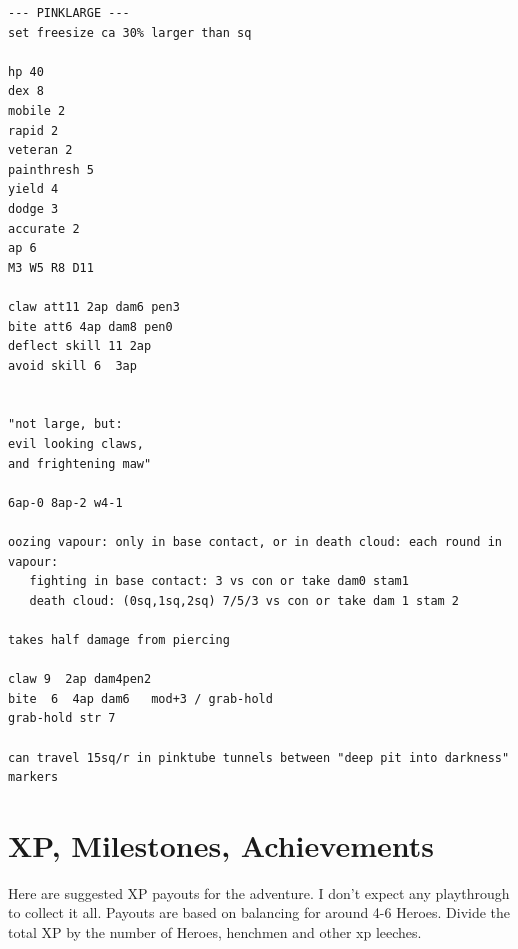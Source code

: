 \goodbreak
\begin{samepage}
\small \begin{verbatim}
--- PINKLARGE ---
set freesize ca 30% larger than sq

hp 40
dex 8
mobile 2
rapid 2
veteran 2
painthresh 5
yield 4
dodge 3
accurate 2
ap 6
M3 W5 R8 D11

claw att11 2ap dam6 pen3
bite att6 4ap dam8 pen0
deflect skill 11 2ap
avoid skill 6  3ap


"not large, but:
evil looking claws,
and frightening maw"

6ap-0 8ap-2 w4-1

oozing vapour: only in base contact, or in death cloud: each round in vapour:
   fighting in base contact: 3 vs con or take dam0 stam1
   death cloud: (0sq,1sq,2sq) 7/5/3 vs con or take dam 1 stam 2

takes half damage from piercing

claw 9  2ap dam4pen2
bite  6  4ap dam6   mod+3 / grab-hold
grab-hold str 7

can travel 15sq/r in pinktube tunnels between "deep pit into darkness" markers
\end{verbatim} \normalsize
\end{samepage}


























\clearpage
{}
\section*{XP, Milestones, Achievements}

Here are suggested XP payouts for the adventure. I don't expect any playthrough to collect it all.
Payouts are based on balancing for around 4-6 Heroes. Divide the total XP by the number of Heroes, henchmen and other xp leeches.

